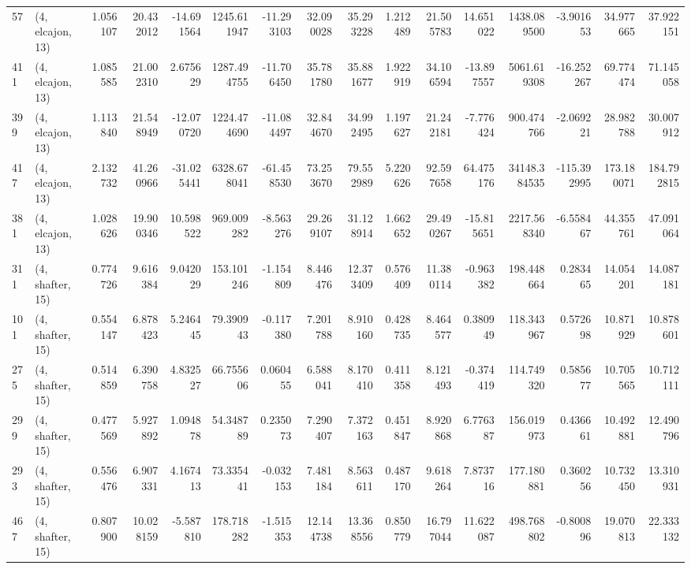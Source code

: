\begin{tabular}{llrrrrrrrrrrrrrr}
57  &  (4, elcajon, 13) &   1.056107 &  20.432012 & -14.691564 &  1245.611947 & -11.293103 &  32.090028 &  35.293228 &  1.212489 &  21.505783 &  14.651022 &   1438.089500 &   -3.901653 &   34.977665 &   37.922151 \\
411 &  (4, elcajon, 13) &   1.085585 &  21.002310 &   2.675629 &  1287.494755 & -11.706450 &  35.781780 &  35.881677 &  1.922919 &  34.106594 & -13.897557 &   5061.619308 &  -16.252267 &   69.774474 &   71.145058 \\
399 &  (4, elcajon, 13) &   1.113840 &  21.548949 & -12.070720 &  1224.474690 & -11.084497 &  32.844670 &  34.992495 &  1.197627 &  21.242181 &  -7.776424 &    900.474766 &   -2.069221 &   28.982788 &   30.007912 \\
417 &  (4, elcajon, 13) &   2.132732 &  41.260966 & -31.025441 &  6328.678041 & -61.458530 &  73.253670 &  79.552989 &  5.220626 &  92.597658 &  64.475176 &  34148.384535 & -115.392995 &  173.180071 &  184.792815 \\
381 &  (4, elcajon, 13) &   1.028626 &  19.900346 &  10.598522 &   969.009282 &  -8.563276 &  29.269107 &  31.128914 &  1.662652 &  29.490267 & -15.815651 &   2217.568340 &   -6.558467 &   44.355761 &   47.091064 \\
311 &  (4, shafter, 15) &   0.774726 &   9.616384 &   9.042029 &   153.101246 &  -1.154809 &   8.446476 &  12.373409 &  0.576409 &  11.380114 &  -0.963382 &    198.448664 &    0.283465 &   14.054201 &   14.087181 \\
101 &  (4, shafter, 15) &   0.554147 &   6.878423 &   5.246445 &    79.390943 &  -0.117380 &   7.201788 &   8.910160 &  0.428735 &   8.464577 &   0.380949 &    118.343967 &    0.572698 &   10.871929 &   10.878601 \\
275 &  (4, shafter, 15) &   0.514859 &   6.390758 &   4.832527 &    66.755606 &   0.060455 &   6.588041 &   8.170410 &  0.411358 &   8.121493 &  -0.374419 &    114.749320 &    0.585677 &   10.705565 &   10.712111 \\
299 &  (4, shafter, 15) &   0.477569 &   5.927892 &   1.094878 &    54.348789 &   0.235073 &   7.290407 &   7.372163 &  0.451847 &   8.920868 &   6.776387 &    156.019973 &    0.436661 &   10.492881 &   12.490796 \\
293 &  (4, shafter, 15) &   0.556476 &   6.907331 &   4.167413 &    73.335441 &  -0.032153 &   7.481184 &   8.563611 &  0.487170 &   9.618264 &   7.873716 &    177.180881 &    0.360256 &   10.732450 &   13.310931 \\
467 &  (4, shafter, 15) &   0.807900 &  10.028159 &  -5.587810 &   178.718282 &  -1.515353 &  12.144738 &  13.368556 &  0.850779 &  16.797044 &  11.622087 &    498.768802 &   -0.800896 &   19.070813 &   22.333132 \\

\end{tabular}
